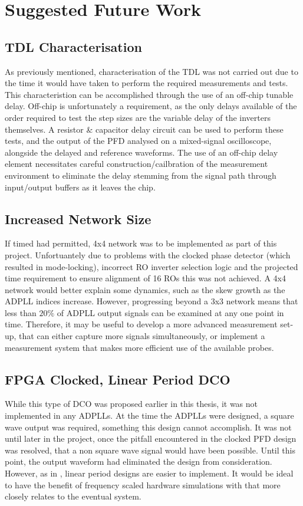 \section{Suggested Future Work}
\subsection{\acl{TDL} Characterisation}
As previously mentioned, characterisation of the \ac{TDL} was not carried out due to the time it would have taken to perform the required measurements and tests. This characteristion can be accomplished through the use of an off-chip tunable delay. Off-chip is unfortunately a requirement, as the only delays available of the order required to test the step sizes are the variable delay of the inverters themselves. A resistor \& capacitor delay circuit can be used to perform these tests, and the output of the \ac{PFD} analysed on a mixed-signal oscilloscope, alongside the delayed and reference waveforms. The use of an off-chip delay element necessitates careful construction/cailbration of the measurement environment to eliminate the delay stemming from the signal path through input/output buffers as it leaves the chip.

\subsection{Increased Network Size}
If timed had permitted, 4x4 network was to be implemented as part of this project. Unfortuantely due to problems with the clocked phase detector  (which resulted in mode-locking), incorrect \ac{RO} inverter selection logic and the projected time requirement to ensure alignment of 16 \acp{RO} this was not achieved. A 4x4 network would better explain some dynamics, such as the skew growth as the \ac{ADPLL} indices increase. However, progressing beyond a 3x3 network means that less than $20\%$ of \ac{ADPLL} output signals can be examined at any one point in time. Therefore, it may be useful to develop a more advanced measurement set-up, that can either capture more signals simultaneously, or implement a measurement system that makes more efficient use of the available probes.

\subsection{\acs{FPGA} Clocked, Linear Period \acs{DCO}}
While this type of \ac{DCO} was proposed earlier in this thesis, it was not implemented in any \acp{ADPLL}. At the time the \acp{ADPLL} were designed, a square wave output was required, something this design cannot accomplish. It was not until later in the project, once the pitfall encountered in the clocked \ac{PFD} design was resolved, that a non square wave signal would have been possible. Until this point, the output waveform had eliminated the design from consideration. However, as in , linear period designs are easier to implement. It would be ideal to have the benefit of frequency scaled hardware simulations with  that more closely relates to the eventual system.

